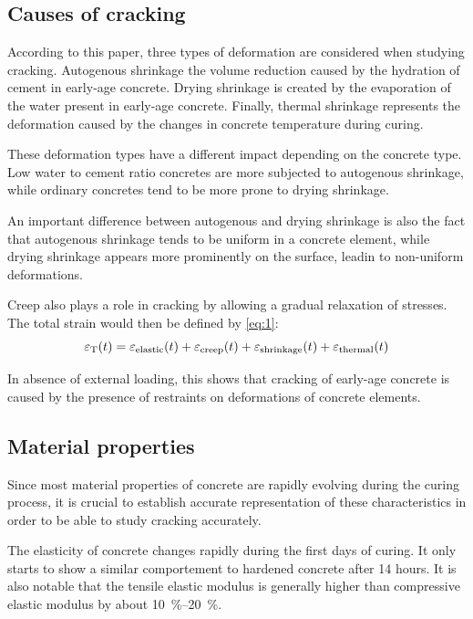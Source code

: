 \documentclass{memoir}
\begin{document}
\subsection{Causes of cracking}
According to this paper, three types of deformation are considered when
studying cracking. Autogenous shrinkage the volume reduction
caused by the hydration of cement in early-age concrete. Drying shrinkage is
created by the evaporation of the water present in early-age concrete. Finally,
thermal shrinkage represents the deformation caused by the changes in concrete
temperature during curing.

These deformation types have a different impact depending on the concrete type.
Low water to cement ratio concretes are more subjected to autogenous shrinkage, while
ordinary concretes tend to be more prone to drying shrinkage.

An important difference between autogenous and drying shrinkage is also the
fact that autogenous shrinkage tends to be uniform in a concrete element, while
drying shrinkage appears more prominently on the surface, leadin to non-uniform
deformations.

Creep also plays a role in cracking by allowing a gradual relaxation of
stresses. The total strain would then be defined by \autoref{eq:1}:
\begin{equation}
  \epsilon_{\text T}(t) =
  \epsilon_{\text{elastic}}(t) +
  \epsilon_{\text{creep}}(t) +
  \epsilon_{\text{shrinkage}}(t) +
  \epsilon_{\text{thermal}}(t)
  \label{eq:1}
\end{equation}

In absence of external loading, this shows that cracking of early-age concrete
is caused by the presence of restraints on deformations of concrete elements.

\subsection{Material properties}
Since most material properties of concrete are rapidly evolving during the
curing process, it is crucial to establish accurate representation of these
characteristics in order to be able to study cracking accurately.

The elasticity of concrete changes rapidly during the first days of curing. It
only starts to show a similar comportement to hardened concrete after 14 hours.
It is also notable that the tensile elastic modulus is generally higher than
compressive elastic modulus by about \SIrange{10}{20}\percent.
\end{document}
